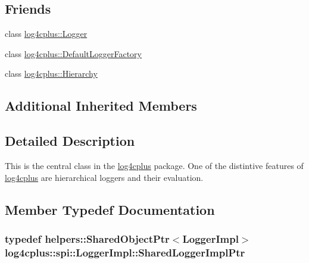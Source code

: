 \subsection*{Friends}
\begin{DoxyCompactItemize}
\item 
class \hyperlink{classlog4cplus_1_1spi_1_1LoggerImpl_a276b42766c69f43c8e6dff5fc5289bce}{log4cplus\-::\-Logger}
\item 
class \hyperlink{classlog4cplus_1_1spi_1_1LoggerImpl_aefe6274366a0895600f35f268e33064c}{log4cplus\-::\-Default\-Logger\-Factory}
\item 
class \hyperlink{classlog4cplus_1_1spi_1_1LoggerImpl_a712678324a3eef2299ee1bed9c1de9ca}{log4cplus\-::\-Hierarchy}
\end{DoxyCompactItemize}
\subsection*{Additional Inherited Members}


\subsection{Detailed Description}
This is the central class in the \hyperlink{namespacelog4cplus}{log4cplus} package. One of the distintive features of \hyperlink{namespacelog4cplus}{log4cplus} are hierarchical loggers and their evaluation. 

\subsection{Member Typedef Documentation}
\hypertarget{classlog4cplus_1_1spi_1_1LoggerImpl_a714f4769a8d2b7f954eb193df7bcd256}{
\subsubsection[{Shared\-Logger\-Impl\-Ptr}]{\setlength{\rightskip}{0pt plus 5cm}typedef {\bf helpers\-::\-Shared\-Object\-Ptr}$<${\bf Logger\-Impl}$>$ {\bf log4cplus\-::spi\-::\-Logger\-Impl\-::\-Shared\-Logger\-Impl\-Ptr}}}\label{classlog4cplus_1_1spi_1_1LoggerImpl_a714f4769a8d2b7f954eb193df7bcd256}


